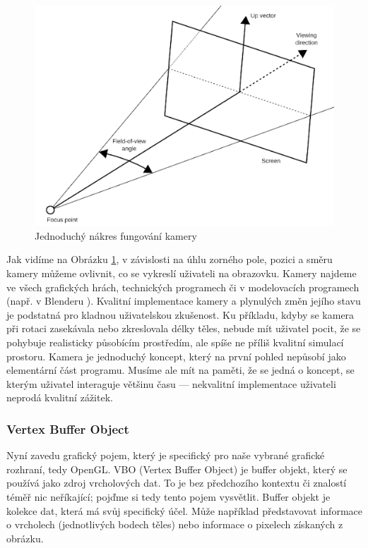\documentclass[12pt]{article}
\begin{document}
\vspace{0.5cm}
\begin{figure}[h]
    \centering
    \includegraphics[width=14cm]{images/camera.png}
    \caption[Jednoduchý nákres fungování kamery]{Jednoduchý nákres fungování kamery \cite{camera_img}}
    \label{fig:Jednoduchý nákres fungování kamery}
\end{figure}

Jak vidíme na Obrázku \ref{fig:Jednoduchý nákres fungování kamery}, v závislosti na úhlu zorného pole, pozici a směru kamery můžeme ovlivnit, co se vykreslí uživateli na obrazovku. Kamery najdeme ve všech grafických hrách, technických programech či v modelovacích programech (např. v Blenderu \cite{blender}). Kvalitní implementace kamery a plynulých změn jejího stavu je podstatná pro kladnou uživatelskou zkušenost. Ku příkladu, kdyby se kamera při rotaci zasekávala nebo zkreslovala délky těles, nebude mít uživatel pocit, že se pohybuje realisticky působícím prostředím, ale spíše ne příliš kvalitní simulací prostoru. Kamera je jednoduchý koncept, který na první pohled nepůsobí jako elementární část programu. Musíme ale mít na paměti, že se jedná o koncept, se kterým uživatel interaguje většinu času — nekvalitní implementace uživateli neprodá kvalitní zážitek.

\subsubsection{Vertex Buffer Object}

Nyní zavedu grafický pojem, který je specifický pro naše vybrané grafické rozhraní, tedy OpenGL. VBO (Vertex Buffer Object) je buffer objekt, který se používá jako zdroj vrcholových dat. To je bez předchozího kontextu či znalostí téměř nic neříkající; pojďme si tedy tento pojem vysvětlit. Buffer objekt \cite{buffer_object} je kolekce dat, která má svůj specifický účel. Může například představovat informace o vrcholech (jednotlivých bodech těles) nebo informace o pixelech získaných z obrázku. \cite{vao_vbo_ebo}
\end{document}
